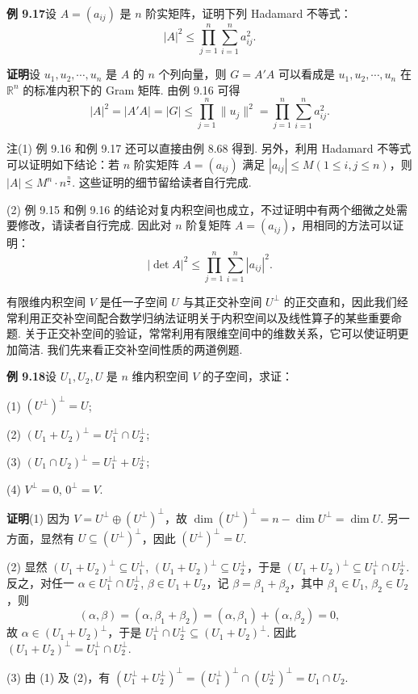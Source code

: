 \documentclass[UTF8, 12pt, fontset=fandol, oneside]{ctexart}
\begin{document}
\noindent\textbf{例 9.17}\quad 设 $A=(a_{ij})$ 是 $n$ 阶实矩阵，证明下列 Hadamard 不等式：
\[
|A|^2\le \prod_{j=1}^n\sum_{i=1}^n a_{ij}^2.
\]

\noindent\textbf{证明}\quad 设 $u_1,u_2,\cdots,u_n$ 是 $A$ 的 $n$ 个列向量，则 $G=A'A$ 可以看成是 $u_1,u_2,\cdots,u_n$ 在 $\mathbb{R}^n$ 的标准内积下的 Gram 矩阵. 由例 9.16 可得
\[
|A|^2=|A'A|=|G|\le \prod_{j=1}^n\|u_j\|^2=\prod_{j=1}^n\sum_{i=1}^n a_{ij}^2.
\]

注\quad (1) 例 9.16 和例 9.17 还可以直接由例 8.68 得到. 另外，利用 Hadamard 不等式可以证明如下结论：若 $n$ 阶实矩阵 $A=(a_{ij})$ 满足 $|a_{ij}|\le M(1\le i,j\le n)$，则 $|A|\le M^n\cdot n^{\frac n2}$. 这些证明的细节留给读者自行完成.

(2) 例 9.15 和例 9.16 的结论对复内积空间也成立，不过证明中有两个细微之处需要修改，请读者自行完成. 因此对 $n$ 阶复矩阵 $A=(a_{ij})$，用相同的方法可以证明：
\[
|\det A|^2\le \prod_{j=1}^n\sum_{i=1}^n |a_{ij}|^2.
\]

有限维内积空间 $V$ 是任一子空间 $U$ 与其正交补空间 $U^\perp$ 的正交直和，因此我们经常利用正交补空间配合数学归纳法证明关于内积空间以及线性算子的某些重要命题. 关于正交补空间的验证，常常利用有限维空间中的维数关系，它可以使证明更加简洁. 我们先来看正交补空间性质的两道例题.

\noindent\textbf{例 9.18}\quad 设 $U_1,U_2,U$ 是 $n$ 维内积空间 $V$ 的子空间，求证：

(1) $(U^\perp)^\perp=U$;

(2) $(U_1+U_2)^\perp=U_1^\perp\cap U_2^\perp$;

(3) $(U_1\cap U_2)^\perp=U_1^\perp+U_2^\perp$;

(4) $V^\perp=0$, $0^\perp=V$.

\noindent\textbf{证明}\quad (1) 因为 $V=U^\perp\oplus (U^\perp)^\perp$，故 $\dim(U^\perp)^\perp=n-\dim U^\perp=\dim U$. 另一方面，显然有 $U\subseteq (U^\perp)^\perp$，因此 $(U^\perp)^\perp=U$.

(2) 显然 $(U_1+U_2)^\perp\subseteq U_1^\perp$, $(U_1+U_2)^\perp\subseteq U_2^\perp$，于是 $(U_1+U_2)^\perp\subseteq U_1^\perp\cap U_2^\perp$. 反之，对任一 $\alpha\in U_1^\perp\cap U_2^\perp$, $\beta\in U_1+U_2$，记 $\beta=\beta_1+\beta_2$，其中 $\beta_1\in U_1$, $\beta_2\in U_2$，则
\[
(\alpha,\beta)=(\alpha,\beta_1+\beta_2)=(\alpha,\beta_1)+(\alpha,\beta_2)=0,
\]
故 $\alpha\in (U_1+U_2)^\perp$，于是 $U_1^\perp\cap U_2^\perp\subseteq (U_1+U_2)^\perp$. 因此 $(U_1+U_2)^\perp=U_1^\perp\cap U_2^\perp$.

(3) 由 (1) 及 (2)，有 $(U_1^\perp+U_2^\perp)^\perp=(U_1^\perp)^\perp\cap (U_2^\perp)^\perp=U_1\cap U_2$.
\end{document}
